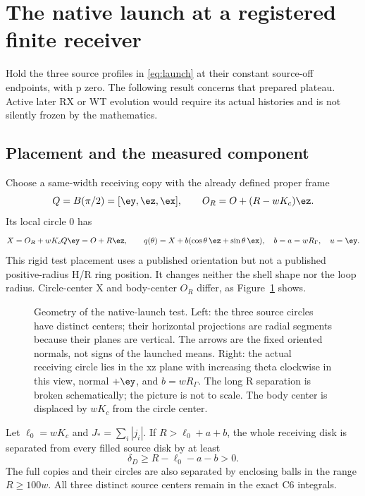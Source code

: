\section{The native launch at a registered finite receiver}\label{sec:receiver}
Hold the three source profiles in \eqref{eq:launch} at their constant source-off endpoints, with p zero. The following result concerns that prepared plateau. Active later RX or WT evolution would require its actual histories and is not silently frozen by the mathematics.

\subsection{Placement and the measured component}
Choose a same-width receiving copy with the already defined proper frame
\begin{equation}\label{eq:receiverplacement}
Q=B(\pi/2)=[\ey,\ez,\ex],\qquad
O_R=O+(R-wK_c)\ez.
\end{equation}
Its local circle 0 has
\begin{equation}\label{eq:nativecontour}
X=O_R+wK_cQ\ey=O+R\ez,\qquad
q(\theta)=X+b(\cos\theta\,\ez+\sin\theta\,\ex),\quad
b=a=wR_\Gamma,\quad u=\ey.
\end{equation}
This rigid test placement uses a published orientation but not a published positive-radius H/R ring position. It changes neither the shell shape nor the loop radius. Circle-center X and body-center \(O_R\) differ, as Figure~\ref{fig:native} shows.

\begin{figure}[tbp]
\centering\resizebox{\textwidth}{!}{}
\caption{Geometry of the native-launch test. Left: the three source circles have distinct centers; their horizontal projections are radial segments because their planes are vertical. The arrows are the fixed oriented normals, not signs of the launched means. Right: the actual receiving circle lies in the xz plane with increasing theta clockwise in this view, normal \(+\ey\), and \(b=wR_\Gamma\). The long R separation is broken schematically; the picture is not to scale. The body center is displaced by \(wK_c\) from the circle center.}\label{fig:native}
\end{figure}

Let \(\ell_0=wK_c\) and \(J_*=\sum_i|j_i|\). If \(R>\ell_0+a+b\), the whole receiving disk is separated from every filled source disk by at least
\begin{equation}\label{eq:clearance}
\delta_D\ge R-\ell_0-a-b>0.
\end{equation}
The full copies and their circles are also separated by enclosing balls in the range \(R\ge100w\). All three distinct source centers remain in the exact C6 integrals.

